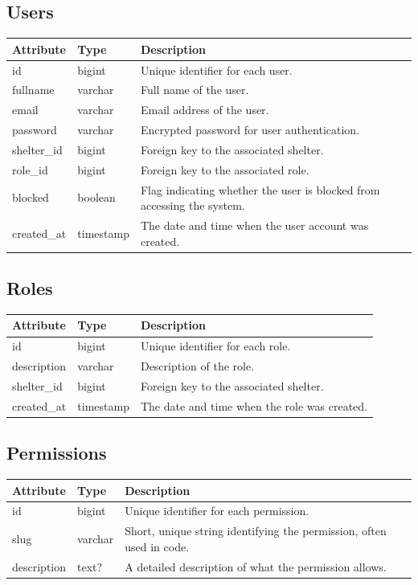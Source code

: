 \documentclass{scrreprt}
\begin{document}
\subsection*{Users}
\begin{tabular}{|m{2.5cm}|m{2.5cm}|m{6cm}|}
\hline
\textbf{Attribute} & \textbf{Type} & \textbf{Description} \\
\hline
id & bigint & Unique identifier for each user. \\
\hline
fullname & varchar & Full name of the user. \\
\hline
email & varchar & Email address of the user. \\
\hline
password & varchar & Encrypted password for user authentication. \\
\hline
shelter\_id & bigint & Foreign key to the associated shelter. \\
\hline
role\_id & bigint & Foreign key to the associated role. \\
\hline
blocked & boolean & Flag indicating whether the user is blocked from accessing the system. \\
\hline
created\_at & timestamp & The date and time when the user account was created. \\
\hline
\end{tabular}

\subsection*{Roles}
\begin{tabular}{|m{2.5cm}|m{2.5cm}|m{6cm}|}
\hline
\textbf{Attribute} & \textbf{Type} & \textbf{Description} \\
\hline
id & bigint & Unique identifier for each role. \\
\hline
description & varchar & Description of the role. \\
\hline
shelter\_id & bigint & Foreign key to the associated shelter. \\
\hline
created\_at & timestamp & The date and time when the role was created. \\
\hline
\end{tabular}

\subsection*{Permissions}
\begin{tabular}{|m{2.5cm}|m{2.5cm}|m{6cm}|}
\hline
\textbf{Attribute} & \textbf{Type} & \textbf{Description} \\
\hline
id & bigint & Unique identifier for each permission. \\
\hline
slug & varchar & Short, unique string identifying the permission, often used in code. \\
\hline
description & text? & A detailed description of what the permission allows. \\
\hline
\end{tabular}
\end{document}
